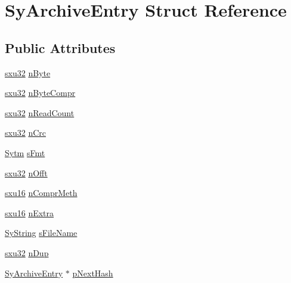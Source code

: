 \hypertarget{struct_sy_archive_entry}{\section{Sy\-Archive\-Entry Struct Reference}
\label{d1/d8c/struct_sy_archive_entry}
}
\subsection*{Public Attributes}
\begin{DoxyCompactItemize}
\item 
\hyperlink{unqlite_8c_abc5a8a3f345c200c98c485551f49666e}{sxu32} \hyperlink{struct_sy_archive_entry_a8eb4b5ec8764f8e765683a07019fe398}{n\-Byte}
\item 
\hyperlink{unqlite_8c_abc5a8a3f345c200c98c485551f49666e}{sxu32} \hyperlink{struct_sy_archive_entry_adf09e795fe90daefc726789b8003f1bb}{n\-Byte\-Compr}
\item 
\hyperlink{unqlite_8c_abc5a8a3f345c200c98c485551f49666e}{sxu32} \hyperlink{struct_sy_archive_entry_a01062ef2805b27103d0df2a738849daa}{n\-Read\-Count}
\item 
\hyperlink{unqlite_8c_abc5a8a3f345c200c98c485551f49666e}{sxu32} \hyperlink{struct_sy_archive_entry_abd59709c96e32897bcd86c816d85de60}{n\-Crc}
\item 
\hyperlink{struct_sytm}{Sytm} \hyperlink{struct_sy_archive_entry_ab9b9770bbbb223a0d4836d5aba4a318c}{s\-Fmt}
\item 
\hyperlink{unqlite_8c_abc5a8a3f345c200c98c485551f49666e}{sxu32} \hyperlink{struct_sy_archive_entry_a17f78ebee5d3379032cb2ce6bcb68204}{n\-Offt}
\item 
\hyperlink{unqlite_8c_a0fea45724d256332e7ae0104f83260a7}{sxu16} \hyperlink{struct_sy_archive_entry_a9d8096514d2595a4cbe662812c1daeb4}{n\-Compr\-Meth}
\item 
\hyperlink{unqlite_8c_a0fea45724d256332e7ae0104f83260a7}{sxu16} \hyperlink{struct_sy_archive_entry_aca3bfe18b130c2e881a1809190d13ea3}{n\-Extra}
\item 
\hyperlink{struct_sy_string}{Sy\-String} \hyperlink{struct_sy_archive_entry_ac6d6029d48e52b3b3db8babf941f48ae}{s\-File\-Name}
\item 
\hyperlink{unqlite_8c_abc5a8a3f345c200c98c485551f49666e}{sxu32} \hyperlink{struct_sy_archive_entry_a3d041619a2e69ddfaba611927e564489}{n\-Dup}
\item 
\hyperlink{struct_sy_archive_entry}{Sy\-Archive\-Entry} $\ast$ \hyperlink{struct_sy_archive_entry_ad9e4970e8ec0d6022bec5925d7267026}{p\-Next\-Hash}

\end{DoxyCompactItemize}
